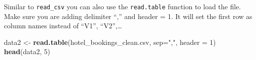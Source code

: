 \documentclass[
]{article}
\newenvironment{Shaded}{\begin{snugshade}}{\end{snugshade}}
\newcommand{\AttributeTok}[1]{\textcolor[rgb]{0.13,0.29,0.53}{#1}}
\newcommand{\DecValTok}[1]{\textcolor[rgb]{0.00,0.00,0.81}{#1}}
\newcommand{\FunctionTok}[1]{\textcolor[rgb]{0.13,0.29,0.53}{\textbf{#1}}}
\newcommand{\NormalTok}[1]{#1}
\newcommand{\OtherTok}[1]{\textcolor[rgb]{0.56,0.35,0.01}{#1}}
\newcommand{\StringTok}[1]{\textcolor[rgb]{0.31,0.60,0.02}{#1}}
\begin{document}
Similar to \texttt{read\_csv} you can also use the \texttt{read.table}
function to load the file. Make sure you are adding delimiter ``,'' and
header = 1. It will set the first row as column names instead of ``V1'',
``V2'',\ldots{}

\begin{Shaded}
\begin{Highlighting}[]
\NormalTok{data2 }\OtherTok{\textless{}{-}} \FunctionTok{read.table}\NormalTok{(}\StringTok{\textquotesingle{}hotel\_bookings\_clean.csv\textquotesingle{}}\NormalTok{, }\AttributeTok{sep=}\StringTok{","}\NormalTok{, }\AttributeTok{header =} \DecValTok{1}\NormalTok{)}
\FunctionTok{head}\NormalTok{(data2, }\DecValTok{5}\NormalTok{)}
\end{Highlighting}
\end{Shaded}
\end{document}

